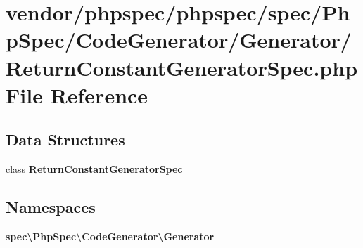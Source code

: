 \section{vendor/phpspec/phpspec/spec/\+Php\+Spec/\+Code\+Generator/\+Generator/\+Return\+Constant\+Generator\+Spec.php File Reference}
\label{_return_constant_generator_spec_8php}
\subsection*{Data Structures}
\begin{DoxyCompactItemize}
\item 
class {\bf Return\+Constant\+Generator\+Spec}
\end{DoxyCompactItemize}
\subsection*{Namespaces}
\begin{DoxyCompactItemize}
\item 
 {\bf spec\textbackslash{}\+Php\+Spec\textbackslash{}\+Code\+Generator\textbackslash{}\+Generator}
\end{DoxyCompactItemize}
